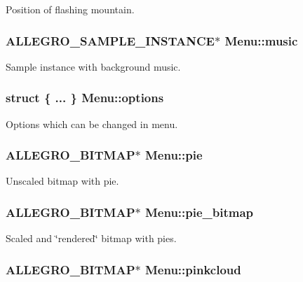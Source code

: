 Position of flashing mountain. \hypertarget{structMenu_a7b8c42bd64118eb18dceafbd9ac8b3d5}{
\subsubsection[{music}]{\setlength{\rightskip}{0pt plus 5cm}A\-L\-L\-E\-G\-R\-O\-\_\-\-S\-A\-M\-P\-L\-E\-\_\-\-I\-N\-S\-T\-A\-N\-C\-E$\ast$ Menu\-::music}}\label{structMenu_a7b8c42bd64118eb18dceafbd9ac8b3d5}
Sample instance with background music. \hypertarget{structMenu_a126bbd1f3999e0e0f9f568282a1ca00b}{
\subsubsection[{options}]{\setlength{\rightskip}{0pt plus 5cm}struct \{ ... \}   Menu\-::options}}\label{structMenu_a126bbd1f3999e0e0f9f568282a1ca00b}
Options which can be changed in menu. \hypertarget{structMenu_a397eb035f88ef8138c4ba29f3fc1d63c}{
\subsubsection[{pie}]{\setlength{\rightskip}{0pt plus 5cm}A\-L\-L\-E\-G\-R\-O\-\_\-\-B\-I\-T\-M\-A\-P$\ast$ Menu\-::pie}}\label{structMenu_a397eb035f88ef8138c4ba29f3fc1d63c}
Unscaled bitmap with pie. \hypertarget{structMenu_ab46ce3041264bac0aabde3abd7549877}{
\subsubsection[{pie\-\_\-bitmap}]{\setlength{\rightskip}{0pt plus 5cm}A\-L\-L\-E\-G\-R\-O\-\_\-\-B\-I\-T\-M\-A\-P$\ast$ Menu\-::pie\-\_\-bitmap}}\label{structMenu_ab46ce3041264bac0aabde3abd7549877}
Scaled and \char`\"{}rendered\char`\"{} bitmap with pies. \hypertarget{structMenu_aec110fca9c47ccf9aaf6e4e7589b86f2}{
\subsubsection[{pinkcloud}]{\setlength{\rightskip}{0pt plus 5cm}A\-L\-L\-E\-G\-R\-O\-\_\-\-B\-I\-T\-M\-A\-P$\ast$ Menu\-::pinkcloud}}\label{structMenu_aec110fca9c47ccf9aaf6e4e7589b86f2}
